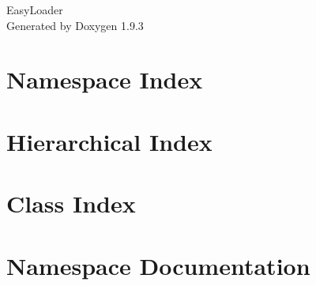 \documentclass[twoside]{book}
\newcommand{\+}{\discretionary{\mbox{\scriptsize$\hookleftarrow$}}{}{}}
\newcommand{\clearemptydoublepage}{%
    \newpage{\pagestyle{empty}\cleardoublepage}%
  }
\begin{document}
  \raggedbottom
    \hypersetup{pageanchor=false,
                bookmarksnumbered=true,
                pdfencoding=unicode
               }
  \begin{titlepage}
  \vspace*{7cm}
  \begin{center}%
  {\Large Easy\+Loader}\\
  \vspace*{1cm}
  {\large Generated by Doxygen 1.9.3}\\
  \end{center}
  \end{titlepage}
  \clearemptydoublepage
  \tableofcontents
  \clearemptydoublepage
  \hypersetup{pageanchor=true}
\chapter{Namespace Index}

\chapter{Hierarchical Index}

\chapter{Class Index}

\chapter{Namespace Documentation}



\end{document}
